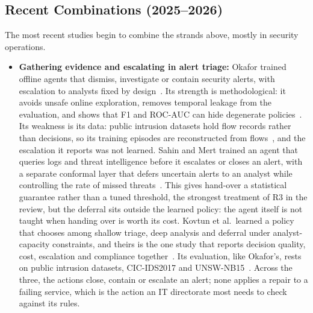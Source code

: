 \subsection{Recent Combinations (2025--2026)}

The most recent studies begin to combine the strands above, mostly in security operations.

\begin{itemize}
\item \textbf{Gathering evidence and escalating in alert triage:} Okafor trained offline agents that dismiss, investigate or contain security alerts, with escalation to analysts fixed by design~\cite{okafor2026}. Its strength is methodological: it avoids unsafe online exploration, removes temporal leakage from the evaluation, and shows that F1 and ROC-AUC can hide degenerate policies~\cite{okafor2026}. Its weakness is its data: public intrusion datasets hold flow records rather than decisions, so its training episodes are reconstructed from flows~\cite{okafor2026}, and the escalation it reports was not learned. Sahin and Mert trained an agent that queries logs and threat intelligence before it escalates or closes an alert, with a separate conformal layer that defers uncertain alerts to an analyst while controlling the rate of missed threats~\cite{sahin2026}. This gives hand-over a statistical guarantee rather than a tuned threshold, the strongest treatment of R3 in the review, but the deferral sits outside the learned policy: the agent itself is not taught when handing over is worth its cost. Kovtun et al.\ learned a policy that chooses among shallow triage, deep analysis and deferral under analyst-capacity constraints, and theirs is the one study that reports decision quality, cost, escalation and compliance together~\cite{kovtun2026}. Its evaluation, like Okafor's, rests on public intrusion datasets, CIC-IDS2017 and UNSW-NB15~\cite{kovtun2026}. Across the three, the actions close, contain or escalate an alert; none applies a repair to a failing service, which is the action an IT directorate most needs to check against its rules.


\end{itemize}

